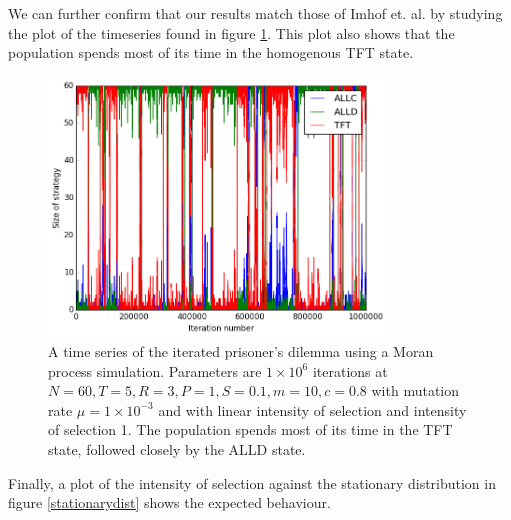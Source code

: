 We can further confirm that our results match those of Imhof et. al. by studying the plot of the timeseries found in figure \ref{timeseries}.
This plot also shows that the population spends most of its time in the homogenous TFT state.

\begin{figure}[h]
    \centering
    \includegraphics[width = 0.8\textwidth]{graphics/timeseries}
    \caption{A time series of the iterated prisoner's dilemma using a Moran process simulation.
    Parameters are $1 \times 10^6$ iterations at $N = 60, T = 5, R = 3, P = 1, S = 0.1, m = 10, c = 0.8$ with mutation rate $\mu = 1 \times 10^{-3}$ and with linear intensity of selection and intensity of selection 1.
    The population spends most of its time in the TFT state, followed closely by the ALLD state.}
    \label{timeseries}
\end{figure}

Finally, a plot of the intensity of selection against the stationary distribution in figure \ref{stationarydist} shows the expected behaviour.

